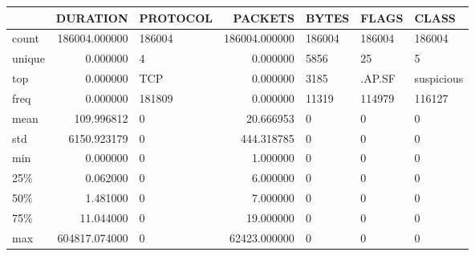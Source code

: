 \begin{tabular}{lrlrlll}
\toprule
{} &       DURATION & PROTOCOL &        PACKETS &     BYTES &   FLAGS &       CLASS \\
\midrule
count  &  186004.000000 &   186004 &  186004.000000 &    186004 &  186004 &      186004 \\
unique &       0.000000 &        4 &       0.000000 &      5856 &      25 &           5 \\
top    &       0.000000 &    TCP   &       0.000000 &      3185 &  .AP.SF &  suspicious \\
freq   &       0.000000 &   181809 &       0.000000 &     11319 &  114979 &      116127 \\
mean   &     109.996812 &        0 &      20.666953 &         0 &       0 &           0 \\
std    &    6150.923179 &        0 &     444.318785 &         0 &       0 &           0 \\
min    &       0.000000 &        0 &       1.000000 &         0 &       0 &           0 \\
25\%    &       0.062000 &        0 &       6.000000 &         0 &       0 &           0 \\
50\%    &       1.481000 &        0 &       7.000000 &         0 &       0 &           0 \\
75\%    &      11.044000 &        0 &      19.000000 &         0 &       0 &           0 \\
max    &  604817.074000 &        0 &   62423.000000 &         0 &       0 &           0 \\
\bottomrule
\end{tabular}
